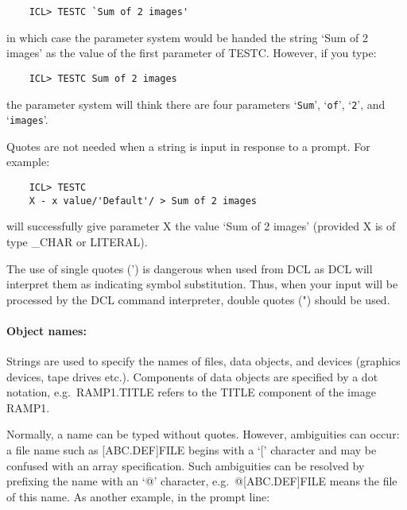 \begin{small}
\begin{verbatim}
    ICL> TESTC `Sum of 2 images'
\end{verbatim}
\end{small}

in which case the parameter system would be handed the string `Sum of 2 images'
as the value of the first parameter of TESTC.
However, if you type:

\begin{small}
\begin{verbatim}
    ICL> TESTC Sum of 2 images
\end{verbatim}
\end{small}

the parameter system will think there are four parameters `\verb+Sum+',
`\verb+of+', `\verb+2+', and `\verb+images+'.

Quotes are not needed when a string is input in response to a prompt.
For example:

\begin{small}
\begin{verbatim}
    ICL> TESTC
    X - x value/'Default'/ > Sum of 2 images
\end{verbatim}
\end{small}

will successfully give parameter X the value `Sum of 2 images' (provided
X is of type \_CHAR or LITERAL).

The use of single quotes (') is dangerous when used from DCL as DCL
will interpret them as indicating symbol substitution.
Thus, when your input will be processed by the DCL command interpreter,
double quotes (") should be used.

\paragraph{Object names:}\hfill

Strings are used to specify the names of files, data objects, and devices
(graphics devices, tape drives etc.).
Components of data objects are specified by a dot notation, e.g.\ RAMP1.TITLE
refers to the TITLE component of the image RAMP1.

Normally, a name can be typed without quotes.
However, ambiguities can occur: a file name such as [ABC.DEF]FILE begins
with a `[' character and may be confused with an array specification.
Such ambiguities can be resolved by prefixing the name with an `@' character,
e.g.\ @[ABC.DEF]FILE means the file of this name.
As another example, in the prompt line:

